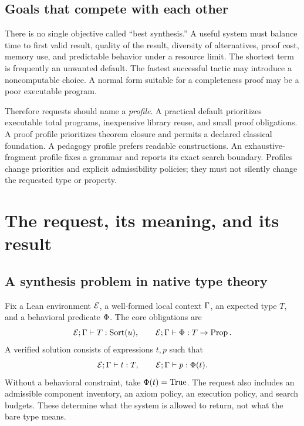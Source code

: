 \subsection{Goals that compete with each other}

There is no single objective called ``best synthesis.'' A useful system must balance time to first valid result, quality of the result, diversity of alternatives, proof cost, memory use, and predictable behavior under a resource limit. The shortest term is frequently an unwanted default. The fastest successful tactic may introduce a noncomputable choice. A normal form suitable for a completeness proof may be a poor executable program.

Therefore requests should name a \emph{profile}. A practical default prioritizes executable total programs, inexpensive library reuse, and small proof obligations. A proof profile prioritizes theorem closure and permits a declared classical foundation. A pedagogy profile prefers readable constructions. An exhaustive-fragment profile fixes a grammar and reports its exact search boundary. Profiles change priorities and explicit admissibility policies; they must not silently change the requested type or property.

\section{The request, its meaning, and its result}
\label{sec:request}

\subsection{A synthesis problem in native type theory}

Fix a Lean environment $\mathcal E$, a well-formed local context $\Gamma$, an expected type $T$, and a behavioral predicate $\Phi$. The core obligations are
\[
 \mathcal E;\Gamma\vdash T:\operatorname{Sort}(u),\qquad
 \mathcal E;\Gamma\vdash\Phi:T\to\operatorname{Prop}.
\]
A verified solution consists of expressions $t,p$ such that
\begin{equation}\label{eq:contract}
 \mathcal E;\Gamma\vdash t:T,
 \qquad
 \mathcal E;\Gamma\vdash p:\Phi(t).
\end{equation}
Without a behavioral constraint, take $\Phi(t)=\operatorname{True}$. The request also includes an admissible component inventory, an axiom policy, an execution policy, and search budgets. These determine what the system is allowed to return, not what the bare type means.

